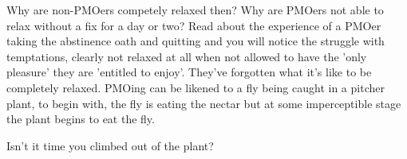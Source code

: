 Why are non-PMOers competely relaxed then? Why are PMOers not able to relax without a fix for a day or two? Read about the experience of a PMOer taking the abstinence oath and quitting and you will notice the struggle with temptations, clearly not relaxed at all when not allowed to have the 'only pleasure' they are 'entitled to enjoy'. They've forgotten what it's like to be completely relaxed. PMOing can be likened to a fly being caught in a pitcher plant, to begin with, the fly is eating the nectar but at some imperceptible stage the plant begins to eat the fly.

Isn't it time you climbed out of the plant?

